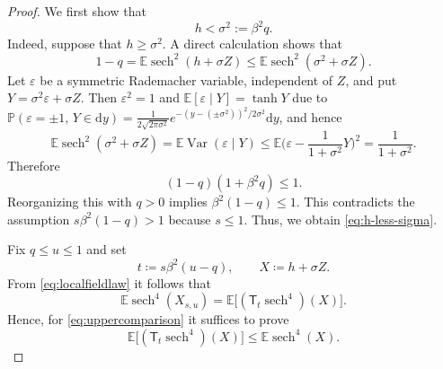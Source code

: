 \documentclass[11pt]{article}
\numberwithin{equation}{section}
\newcommand{\E}{\mathbb{E}}
\newcommand{\1}{\mathbf 1}
\newcommand{\sech}{\operatorname{sech}}
\begin{document}
\begin{proof}
We first show that 
\begin{equation}
 h<\sigma^2:=\beta^2    q .
 \label{eq:h-less-sigma}
\end{equation}
Indeed, suppose that $h\ge\sigma^2$. A direct calculation shows that 
\[
 1-q
 =
 \mathbb{E}\sech^2(h+\sigma Z)
 \le
 \mathbb{E}\sech^2(\sigma^2+\sigma Z).
\]
Let $\varepsilon$ be a symmetric Rademacher variable, independent of $Z$,
and put $Y=\sigma^2\varepsilon+\sigma Z$. Then $\varepsilon^2=1$ and 
$\E[\varepsilon\mid Y]=\tanh Y$ due to $\mathbb P(\varepsilon=\pm 1,\,Y\in {\mathrm d}y) = \frac{1}{2\sqrt{2\pi \sigma^2}}e^{-(y - (\pm \sigma^2) )^2/2\sigma^2} {\mathrm d}y$, and hence
\[
 \mathbb{E}\sech^2(\sigma^2+\sigma Z)
 =
 \E\operatorname{Var}(\varepsilon\mid Y)
 \le
\E\Big(\varepsilon-\frac{1}{1+\sigma^2}Y\Big)^2
 =
 \frac{1}{1+\sigma^2}.
\]
Therefore
\[
 (1-q)(1+\beta^2q)\le1.
\]
Reorganizing this with $q>0$ implies $\beta^2(1-q)\le1$. This contradicts the assumption 
$s\beta^2(1-q)>1$ because $s\le1$.
Thus, we obtain \eqref{eq:h-less-sigma}.

Fix $q\le u\le1$ and set
\[
 t\coloneqq s\beta^2(u-q),
 \qquad
 X\coloneqq h+\sigma Z.
\]
From \eqref{eq:localfieldlaw} it follows that
\[
 \mathbb{E}\sech^4(X_{s,u})
 =
 \E\bigl[(\mathsf T_t\sech^4)(X)\bigr].
\]
Hence, for \eqref{eq:uppercomparison} it suffices to prove
\[
 \E\bigl[(\mathsf T_t\sech^4)(X)\bigr]
 \le
 \mathbb{E}\sech^4(X).
\]




\end{proof}
\end{document}
